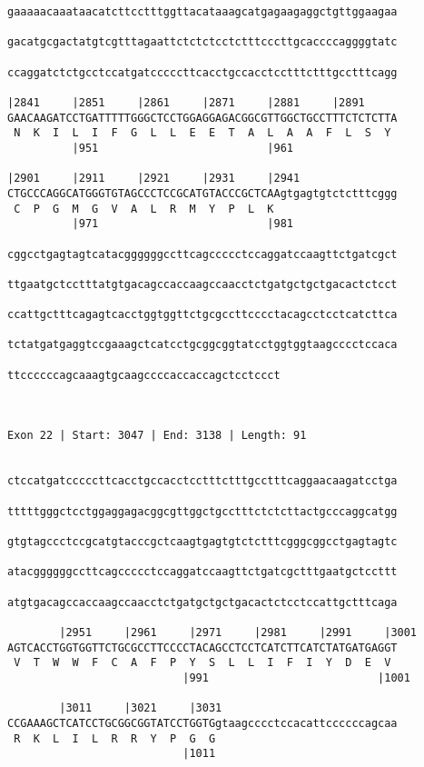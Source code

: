 \documentclass{article}
\begin{document}
\begin{Verbatim}
gaaaaacaaataacatcttcctttggttacataaagcatgagaagaggctgttggaagaa
                                                            
gacatgcgactatgtcgtttagaattctctctcctctttcccttgcaccccaggggtatc
                                                            
ccaggatctctgcctccatgatcccccttcacctgccacctcctttctttgcctttcagg
                                                            
|2841     |2851     |2861     |2871     |2881     |2891     
GAACAAGATCCTGATTTTTGGGCTCCTGGAGGAGACGGCGTTGGCTGCCTTTCTCTCTTA
 N  K  I  L  I  F  G  L  L  E  E  T  A  L  A  A  F  L  S  Y 
          |951                          |961                
  
|2901     |2911     |2921     |2931     |2941               
CTGCCCAGGCATGGGTGTAGCCCTCCGCATGTACCCGCTCAAgtgagtgtctctttcggg
 C  P  G  M  G  V  A  L  R  M  Y  P  L  K                   
          |971                          |981
  
cggcctgagtagtcatacggggggccttcagccccctccaggatccaagttctgatcgct

ttgaatgctcctttatgtgacagccaccaagccaacctctgatgctgctgacactctcct

ccattgctttcagagtcacctggtggttctgcgccttcccctacagcctcctcatcttca

tctatgatgaggtccgaaagctcatcctgcggcggtatcctggtggtaagcccctccaca

ttccccccagcaaagtgcaagccccaccaccagctcctccct
                                          

 
Exon 22 | Start: 3047 | End: 3138 | Length: 91


ctccatgatcccccttcacctgccacctcctttctttgcctttcaggaacaagatcctga

tttttgggctcctggaggagacggcgttggctgcctttctctcttactgcccaggcatgg

gtgtagccctccgcatgtacccgctcaagtgagtgtctctttcgggcggcctgagtagtc

atacggggggccttcagccccctccaggatccaagttctgatcgctttgaatgctccttt

atgtgacagccaccaagccaacctctgatgctgctgacactctcctccattgctttcaga

        |2951     |2961     |2971     |2981     |2991     |3001
AGTCACCTGGTGGTTCTGCGCCTTCCCCTACAGCCTCCTCATCTTCATCTATGATGAGGT
 V  T  W  W  F  C  A  F  P  Y  S  L  L  I  F  I  Y  D  E  V 
                           |991                          |1001
  
        |3011     |3021     |3031                           
CCGAAAGCTCATCCTGCGGCGGTATCCTGGTGgtaagcccctccacattccccccagcaa
 R  K  L  I  L  R  R  Y  P  G  G                            
                           |1011                           
  

\end{Verbatim}
\end{document}
